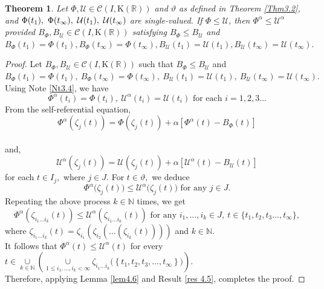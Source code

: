 \documentclass[12pt,oneside,reqno]{amsart}
\newtheorem{theorem}{Theorem}[section]
\theoremstyle{definition}
\theoremstyle{remark}
\begin{document}
\begin{theorem}\label{Thm4.7}
Let $\Phi,\mathcal{U} \in \mathcal{C}(I , \mathrm{K}( \mathbb{R}))$ and $\vartheta$ as defined in Theorem \ref{Thm3.2}, and $\Phi(t_1),~\Phi(t_\infty),\\ ~\mathcal{U}(t_1),~\mathcal{U}(t_\infty)$ are single-valued. If $\Phi \le \mathcal{U}$, then $\Phi^{\alpha} \le \mathcal{U}^{\alpha}$ provided $B_\Phi, B_\mathcal{U} \in \mathcal{C}(I , \mathrm{K}( \mathbb{R}))$ satisfying $B_\Phi \le B_\mathcal{U}$ and $B_\Phi(t_1)=\Phi(t_1),B_\Phi(t_\infty)=\Phi(t_\infty),B_\mathcal{U}(t_1)=\mathcal{U}(t_1),B_\mathcal{U}(t_\infty)=\mathcal{U}(t_\infty).$
\end{theorem}
\begin{proof}
Let $B_\Phi, B_\mathcal{U} \in \mathcal{C}(I , \mathrm{K}( \mathbb{R}) )$ such that $B_\Phi \le B_\mathcal{U}$ and $B_\Phi(t_1)=\Phi(t_1),~B_\Phi(t_\infty)=\Phi(t_\infty),~B_\mathcal{U}(t_1)=\mathcal{U}(t_1),~B_\mathcal{U}(t_\infty)=\mathcal{U}(t_\infty).$
Using Note \ref{Nt3.4}, we have 
\[\Phi^{\alpha}(t_i)=\Phi(t_i),~\mathcal{U}^{\alpha}(t_i)=\mathcal{U}(t_i) \text{ for each } i=1,2,3\ldots \]
From the self-referential equation, 
\[ \Phi^{\alpha}\left(\zeta_j(t)\right)= \Phi\left(\zeta_j(t)\right) + \alpha  \left[\Phi^{\alpha}(t) - B_\Phi(t)\right]\] \\ and, \[\mathcal{U}^{\alpha}\left(\zeta_j(t)\right)= \mathcal{U}\left(\zeta_j(t)\right) + \alpha  \left[\mathcal{U}^{\alpha}(t) - B_\mathcal{U}(t)\right]\]
 for each $ t \in I_j, $ where $j \in J.$ For $t \in \vartheta,$ we deduce \[\Phi^{\alpha}\big(\zeta_j(t)\big) \le \mathcal{U}^{\alpha}\big(\zeta_j(t)\big) \text{ for any } j \in J.\]
 Repeating the above process $k\in \mathbb{N}$ times, we get
 \[\Phi^{\alpha}\left(\zeta_{i_{1}\ldots i_{k}}(t)\right)\le \mathcal{U}^{\alpha}\left(\zeta_{i_{1}\ldots i_{k}}(t)\right) \text{ for any } i_1,\ldots, i_k \in J, ~ t \in \{t_1,t_2,t_3\ldots,t_\infty\},\]
 where $\zeta_{i_{1}\ldots i_{k}}(t)=\zeta_{i_{1}}(\zeta_{i_{2}}(\ldots (\zeta_{i_{k}}(t))))$ and $k \in \mathbb{N}.$\\
 It follows that $\Phi^{\alpha}(t)\le \mathcal{U}^{\alpha}(t)$ for every  $t\in \underset{k \in \mathbb{N}}{\cup}\left(\underset{1\leq i_1,\ldots,i_k< \infty}{\cup}\zeta_{i_{1}\ldots i_{k}}\big(\left\{t_1,t_2,t_3,\ldots,t_\infty\right\}\big)\right).$ \\
Therefore, applying Lemma \ref{lem4.6} and Result \ref{res 4.5}, completes the proof.
\end{proof}
\end{document}
